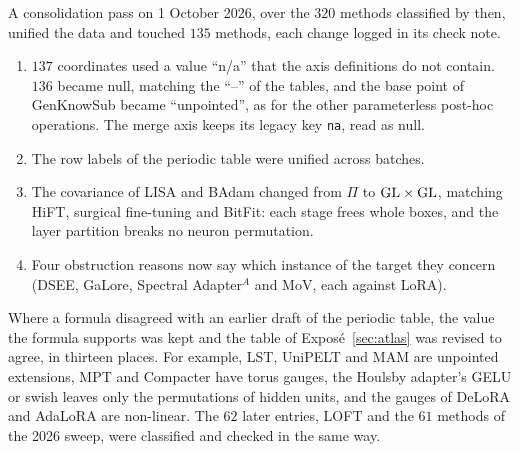 A consolidation pass on 1 October 2026, over the $320$ methods classified by then, unified the data and touched $135$
methods, each change logged in its check note.
\begin{enumerate}[label=(\arabic*)]
  \item $137$ coordinates used a value ``n/a'' that the axis definitions do not contain. $136$ became null, matching
  the ``--'' of the tables, and the base point of GenKnowSub became ``unpointed'', as for the other parameterless
  post-hoc operations. The merge axis keeps its legacy key \texttt{na}, read as null.
  \item The row labels of the periodic table were unified across batches.
  \item The covariance of LISA and BAdam changed from $\Pi$ to $\mathrm{GL}\times\mathrm{GL}$, matching HiFT, surgical fine-tuning and
  BitFit: each stage frees whole boxes, and the layer partition breaks no neuron permutation.
  \item Four obstruction reasons now say which instance of the target they concern (DSEE, GaLore, Spectral Adapter$^A$
  and MoV, each against LoRA).
\end{enumerate}
Where a formula disagreed with an earlier draft of the periodic table, the value the formula supports was kept and the
table of Exposé~\ref{sec:atlas} was revised to agree, in thirteen places. For example, LST, UniPELT
and MAM are unpointed extensions, MPT and Compacter have torus gauges, the Houlsby adapter's GELU or swish leaves only the
permutations of hidden units, and the gauges of DeLoRA and AdaLoRA are non-linear. The $62$ later entries, LOFT and the
$61$ methods of the 2026 sweep, were classified and checked in the same way.

